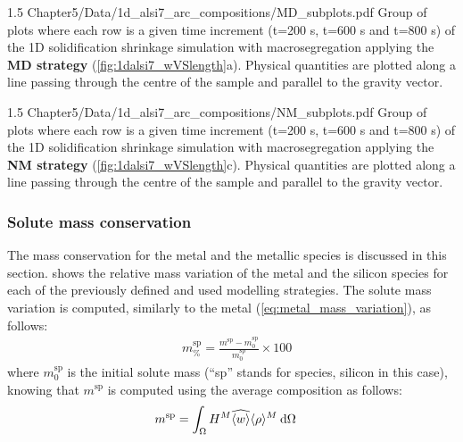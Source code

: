 \begin{landscape}
\begin{figureth}
{1.5}
{Chapter5/Data/1d_alsi7_arc_compositions/MD_subplots.pdf}
{Group of plots where each row is a given time increment (t=200 s, t=600 s and t=800 s) of the 1D solidification shrinkage simulation with macrosegregation
applying the \textbf{MD strategy}  (\cref{fig:1dalsi7_wVSlength}a). 
Physical quantities are plotted along a line passing through the centre of the sample and parallel to the gravity vector.}
\label{fig:MD_subplots}
\end{figureth}
\end{landscape}

\begin{landscape}
\begin{figureth}
{1.5}
{Chapter5/Data/1d_alsi7_arc_compositions/NM_subplots.pdf}
{Group of plots where each row is a given time increment (t=200 s, t=600 s and t=800 s) of the 1D solidification shrinkage simulation with macrosegregation
applying the \textbf{NM strategy} (\cref{fig:1dalsi7_wVSlength}c).
Physical quantities are plotted along a line passing through the centre of the sample and parallel to the gravity vector.}
\label{fig:NM_subplots}
\end{figureth}
\end{landscape}



\subsubsection{Solute mass conservation}

The mass conservation for the metal and the metallic species is discussed in this section.
 shows the relative mass variation of the metal and the silicon species
for each of the previously defined and used modelling strategies.
The solute mass variation is computed, similarly to the metal (\cref{eq:metal_mass_variation}), as follows:
\begin{align}
\label{eq:solute_mass_variation}
&  m^\text{sp}_\% = \frac{m^\text{sp} - m^\text{sp}_0}{m^\text{sp}_0} \times 100	
\end{align}
where $m^\text{sp}_0$ is the initial solute mass (``sp'' stands for species, silicon in this case), knowing that
$m^\text{sp}$ is computed using the average composition as follows:
\begin{align}
\label{eq:solute_mass_initial}
&  m^\text{sp} = \int_{\Omega} H^M \widehat{\langle w \rangle} \langle \rho \rangle^M \: \mathrm{d}\Omega
\end{align}

